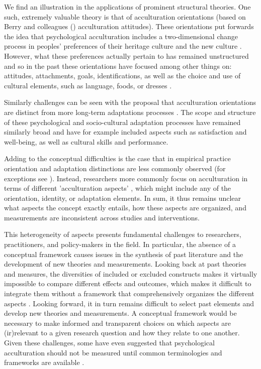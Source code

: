 \documentclass[man, 12pt, a4paper]{apa7}
\begin{document}
We find an illustration in the applications of prominent structural theories. One such, extremely valuable theory is that of acculturation orientations (based on Berry and colleagues (\citeyear{Berry1997b, Berry2003}) acculturation attitudes). These orientations put forwards the idea that psychological acculturation includes a two-dimensional change process in peoples' preferences of their heritage culture and the new culture \citep[e.g.,][]{Ward2001, Berry2003}. However, what these preferences actually pertain to has remained unstructured and so in the past these orientations have focused among other things on: attitudes, attachments, goals, identifications, as well as the choice and use of cultural elements, such as language, foods, or dresses \citep[e.g.,][]{Rudmin2003a}.

Similarly challenges can be seen with the proposal that acculturation orientations are distinct from more long-term adaptations processes \citep{Searle1990, Ward2001, Berry2003}. The scope and structure of these psychological and socio-cultural adaptation processes have remained similarly broad and have for example included aspects such as satisfaction and well-being, as well as cultural skills and performance. 

Adding to the conceptual difficulties is the case that in empirical practice orientation and adaptation distinctions are less commonly observed (for exceptions see \citealp{ICSEYteam2006, Berry2006b, TeLindert2008a}). Instead, researchers more commonly focus on acculturation in terms of different 'acculturation aspects' \citep{Arends-Toth2006a}, which might include any of the orientation, identity, or adaptation elements. In sum, it thus remains unclear what aspects the concept exactly entails, how these aspects are organized, and measurements are inconsistent across studies and interventions.

This heterogeneity of aspects presents fundamental challenges to researchers, practitioners, and policy-makers in the field. In particular, the absence of a conceptual framework causes issues in the synthesis of past literature and the development of new theories and measurements.
Looking back at past theories and measures, the diversities of included or excluded constructs makes it virtually impossible to compare different effects and outcomes, which makes it difficult to integrate them without a framework that comprehensively organizes the different aspects \citep{Taft1981}.
Looking forward, it in turn remains difficult to select past elements and develop new theories and measurements. A conceptual framework would be necessary to make informed and transparent choices on which aspects are (ir)relevant to a given research question and how they relate to one another.
Given these challenges, some have even suggested that psychological acculturation should not be measured until common terminologies and frameworks are available \citep{Escobar2000}.
\end{document}

